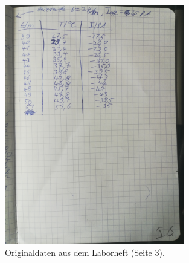\begin{figure}
    \centering
    \includegraphics[width=0.7\textwidth]{content/data/daten3.jpg}
    \caption{Originaldaten aus dem Laborheft (Seite 3).}
\end{figure}